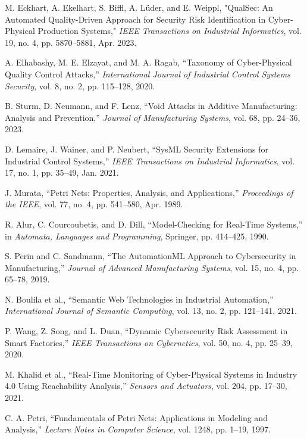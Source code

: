 \documentclass[conference]{IEEEtran}
\begin{document}
\begin{thebibliography}{15}

M. Eckhart, A. Ekelhart, S. Biffl, A. Lüder, and E. Weippl, "QualSec: An Automated Quality-Driven Approach for Security Risk Identification in Cyber-Physical Production Systems," \emph{IEEE Transactions on Industrial Informatics}, vol. 19, no. 4, pp. 5870--5881, Apr. 2023.

A. Elhabashy, M. E. Elzayat, and M. A. Ragab, ``Taxonomy of Cyber-Physical Quality Control Attacks,'' \emph{International Journal of Industrial Control Systems Security}, vol. 8, no. 2, pp. 115--128, 2020.

B. Sturm, D. Neumann, and F. Lenz, ``Void Attacks in Additive Manufacturing: Analysis and Prevention,'' \emph{Journal of Manufacturing Systems}, vol. 68, pp. 24--36, 2023.

D. Lemaire, J. Wainer, and P. Neubert, ``SysML Security Extensions for Industrial Control Systems,'' \emph{IEEE Transactions on Industrial Informatics}, vol. 17, no. 1, pp. 35--49, Jan. 2021.

J. Murata, ``Petri Nets: Properties, Analysis, and Applications,'' \emph{Proceedings of the IEEE}, vol. 77, no. 4, pp. 541--580, Apr. 1989.

R. Alur, C. Courcoubetis, and D. Dill, ``Model-Checking for Real-Time Systems,'' in \emph{Automata, Languages and Programming}, Springer, pp. 414--425, 1990. 

S. Perin and C. Sandmann, ``The AutomationML Approach to Cybersecurity in Manufacturing,'' \emph{Journal of Advanced Manufacturing Systems}, vol. 15, no. 4, pp. 65--78, 2019.

N. Boulila et al., ``Semantic Web Technologies in Industrial Automation,'' \emph{International Journal of Semantic Computing}, vol. 13, no. 2, pp. 121--141, 2021. 

P. Wang, Z. Song, and L. Duan, ``Dynamic Cybersecurity Risk Assessment in Smart Factories,'' \emph{IEEE Transactions on Cybernetics}, vol. 50, no. 4, pp. 25--39, 2020. 

M. Khalid et al., ``Real-Time Monitoring of Cyber-Physical Systems in Industry 4.0 Using Reachability Analysis,'' \emph{Sensors and Actuators}, vol. 204, pp. 17--30, 2021.

C. A. Petri, ``Fundamentals of Petri Nets: Applications in Modeling and Analysis,'' \emph{Lecture Notes in Computer Science}, vol. 1248, pp. 1--19, 1997. 


\end{thebibliography}
\end{document}
